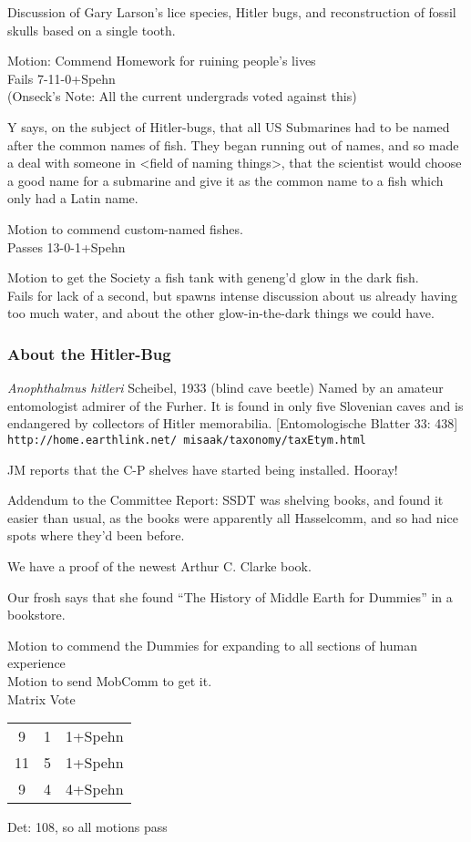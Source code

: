 \documentclass[10pt]{article}
\begin{document}
Discussion of Gary Larson's lice species, Hitler bugs, and
reconstruction of fossil skulls based on a single tooth.

Motion: Commend Homework for ruining people's lives\\
Fails 7-11-0+Spehn\\
(Onseck's Note: All the current undergrads voted against this)

Y says, on the subject of Hitler-bugs, that all US Submarines had
to be named after the common names of fish. They began running out of
names, and so made a deal with someone in <field of naming things>,
that the scientist would choose a good name for a submarine and give
it as the common name to a fish which only had a Latin name. 

Motion to commend custom-named fishes.\\
Passes 13-0-1+Spehn

Motion to get the Society a fish tank with geneng'd glow in the dark
fish.\\
Fails for lack of a second, but spawns intense discussion about us
already having too much water, and about the other glow-in-the-dark
things we could have.

\subsubsection*{About the Hitler-Bug}
     {\em Anophthalmus hitleri} Scheibel, 1933 (blind cave beetle) Named by
       an amateur entomologist admirer of the Furher. It is found in only
       five Slovenian caves and is endangered by collectors of Hitler
       memorabilia. [Entomologische Blatter  33: 438]\\
       {\tt http://home.earthlink.net/~misaak/taxonomy/taxEtym.html}

JM reports that the C-P shelves have started being installed. Hooray!

Addendum to the Committee Report: SSDT was shelving books, and found
it easier than usual, as the books were apparently all Hasselcomm, and
so had nice spots where they'd been before.

We have a proof of the newest Arthur C. Clarke book.

Our frosh says that she found 
``The History of Middle Earth for Dummies'' in a bookstore.

Motion to commend the Dummies for expanding to all sections of human
experience\\
Motion to send MobComm to get it.\\
Matrix Vote\\
\begin{tabular}{ccc}
9 & 1 & 1+Spehn\\
11 & 5 & 1+Spehn\\
9 & 4 & 4+Spehn\\
\end{tabular}
Det: 108, so all motions pass
\end{document}
